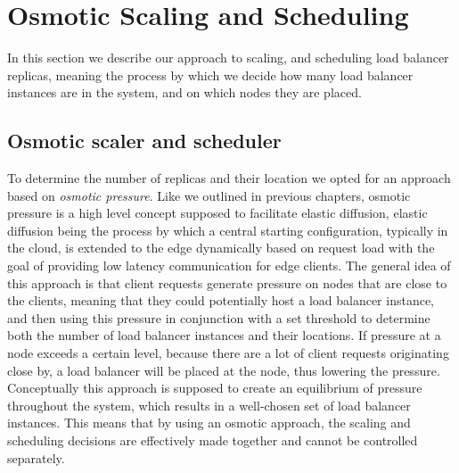 
\section{Osmotic Scaling and Scheduling}
In this section we describe our approach to scaling, and scheduling load balancer replicas, meaning the process by which we decide how many load balancer instances are in the system, and on which nodes they are placed.

\subsection{Osmotic scaler and scheduler}
To determine the number of replicas and their location we opted for an approach based on \textit{osmotic pressure}.
Like we outlined in previous chapters, osmotic pressure is a high level concept supposed to facilitate elastic diffusion, elastic diffusion being the process by which a central starting configuration, typically in the cloud, is extended to the edge dynamically based on request load with the goal of providing low latency communication for edge clients\cite{osmotic-middleware-rausch}. 
The general idea of this approach is that client requests generate pressure on nodes that are close to the clients, meaning that they could potentially host a load balancer instance, and then using this pressure in conjunction with a set threshold to determine both the number of load balancer instances and their locations.
If pressure at a node exceeds a certain level, because there are a lot of client requests originating close by, a load balancer will be placed at the node, thus lowering the pressure.
Conceptually this approach is supposed to create an equilibrium of pressure throughout the system, which results in a well-chosen set of load balancer instances.
This means that by using an osmotic approach, the scaling and scheduling decisions are effectively made together and cannot be controlled separately.

